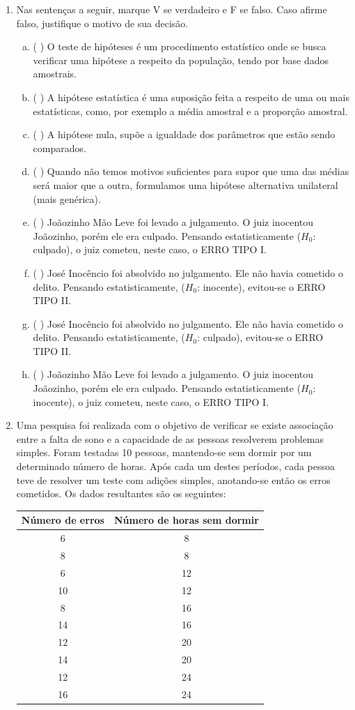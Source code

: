 \documentclass[12pt, a4paper]{article}
\begin{document}
\begin{enumerate}
\item Nas sentenças a seguir, marque V se verdadeiro e F se falso. Caso afirme falso, justifique o motivo de sua decisão.
\begin{enumerate}[a)]
    \item ( ) O teste de hipóteses é um procedimento estatístico onde se busca verificar uma hipótese a respeito da população, tendo por base dados amostrais.
    \item ( ) A hipótese estatística é uma suposição feita a respeito de uma ou mais estatísticas, como, por exemplo a média amostral e a proporção amostral.
    \item ( ) A hipótese nula, supõe a igualdade dos parâmetros que estão sendo comparados.
    \item ( ) Quando não temos motivos suficientes para supor que uma das médias será maior que a outra, formulamos uma hipótese alternativa unilateral (mais genérica).
    \item ( ) Joãozinho Mão Leve foi levado a julgamento. O juiz inocentou Joãozinho, porém ele era culpado. Pensando estatisticamente ($H_0$: culpado), o juiz cometeu, neste caso, o ERRO TIPO I.
    \item ( ) José Inocêncio foi absolvido no julgamento. Ele não havia cometido o delito. Pensando estatisticamente, ($H_0$: inocente), evitou-se o ERRO TIPO II.
    \item ( ) José Inocêncio foi absolvido no julgamento. Ele não havia cometido o delito. Pensando estatisticamente, ($H_0$: culpado), evitou-se o ERRO TIPO II.
    \item ( ) Joãozinho Mão Leve foi levado a julgamento. O juiz inocentou Joãozinho, porém ele era culpado. Pensando estatisticamente ($H_0$: inocente), o juiz cometeu, neste caso, o ERRO TIPO I.
\end{enumerate}

\item Uma pesquisa foi realizada com o objetivo de verificar se existe associação entre a falta de sono e a capacidade de as pessoas resolverem problemas simples. Foram testadas 10 pessoas, mantendo-se sem dormir por um determinado número de horas. Após cada um destes períodos, cada pessoa teve de resolver um teste com adições simples, anotando-se então os erros cometidos. Os dados resultantes são os seguintes:

\begin{center}
\begin{tabular}{|c|c|}
\hline
\textbf{Número de erros} & \textbf{Número de horas sem dormir} \\
\hline
6 & 8 \\
8 & 8 \\
6 & 12 \\
10 & 12 \\
8 & 16 \\
14 & 16 \\
12 & 20 \\
14 & 20 \\
12 & 24 \\
16 & 24 \\
\hline
\end{tabular}
\end{center}


\end{enumerate}
\end{document}
